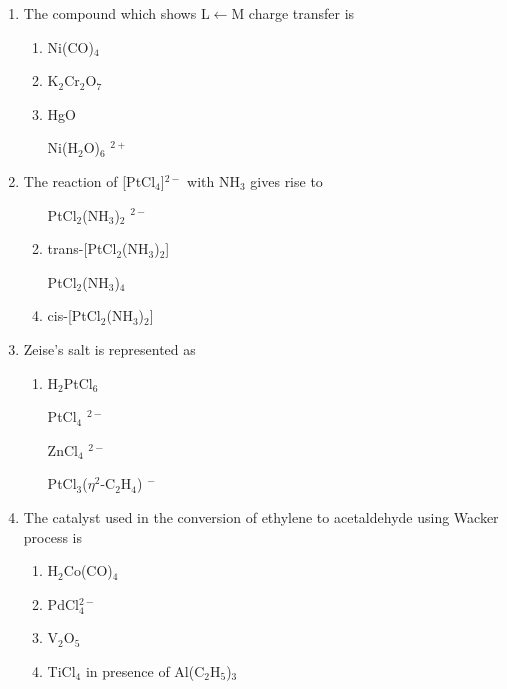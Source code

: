\documentclass[journal,12pt,onecolumn]{IEEEtran}
\theoremstyle{remark}
\begin{document}
\begin{enumerate}
\item The compound which shows L$\leftarrow$M charge transfer is  \hfill{}

\begin{multicols}{2}
\begin{enumerate}[label=(\Alph*)]
\item Ni(CO)$_4$  
\item K$_2$Cr$_2$O$_7$  
\item HgO  
 \item   [Ni(H$_2$O)$_6$]$^{2+}$  
\end{enumerate}
\end{multicols}
  

\item The reaction of [PtCl$_4$]$^{2-}$ with NH$_3$ gives rise to  \hfill{}

\begin{multicols}{2}
\begin{enumerate}[label=(\Alph*)]
 \item   [PtCl$_2$(NH$_3$)$_2$]$^{2-}$  
 \item   trans-[PtCl$_2$(NH$_3$)$_2$]  
 \item   [PtCl$_2$(NH$_3$)$_4$]  
 \item   cis-[PtCl$_2$(NH$_3$)$_2$]  
\end{enumerate}
\end{multicols}
  

\item  Zeise's salt is represented as  \hfill{}

\begin{multicols}{2}
\begin{enumerate}[label=(\Alph*)]
 \item   H$_2$PtCl$_6$  
 \item   [PtCl$_4$]$^{2-}$  
 \item   [ZnCl$_4$]$^{2-}$  
 \item   [PtCl$_3$($\eta^2$-C$_2$H$_4$)]$^{-}$  
\end{enumerate}
\end{multicols}
  

\item  The catalyst used in the conversion of ethylene to acetaldehyde using Wacker process is  \hfill{}

\begin{multicols}{2}
\begin{enumerate}[label=(\Alph*)]
\item H$_2$Co(CO)$_4$  
\item PdCl$_4^{2-}$  
\item V$_2$O$_5$  
\item TiCl$_4$ in presence of Al(C$_2$H$_5$)$_3$  
\end{enumerate}
\end{multicols}
  


\end{enumerate}
\end{document}
